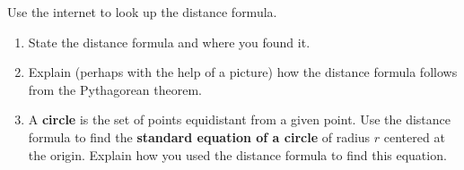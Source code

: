 \documentclass[noauthor,nooutcomes,handout,hints]{ximera}
\begin{document}

\mynewpage
\begin{question}
  Use the internet to look up the distance formula. 
  \begin{enumerate}
    \item State the distance formula and where you found it. 
    \item Explain (perhaps with the help of a picture) how the
      distance formula follows from the Pythagorean theorem.
    \item A \textbf{circle} is the set of points equidistant from a
      given point. Use the distance formula to find the
      \textbf{standard equation of a circle} of radius $r$ centered at
      the origin. Explain how you used the distance formula to find this equation. 
  \end{enumerate}
\end{question}
\end{document}
